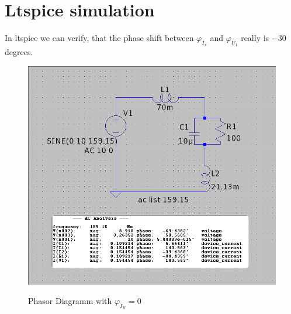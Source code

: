 \documentclass[a4paper]{article}
\begin{document}
\section{Ltspice simulation}
In ltspice we can verify, that the phase shift between $\varphi_{I_{x}}$ and $\varphi_{U_{1}}$
really is $-30$ degrees. \\
\begin{figure}[h!]
	\centering
	\includegraphics[scale=0.6]{./Figures/assignment5_sim_aclist.png}
	\label{sim_1}
	\caption{Phasor Diagramm with $\varphi_{I_{R}} = 0$}
\end{figure}
\end{document}
